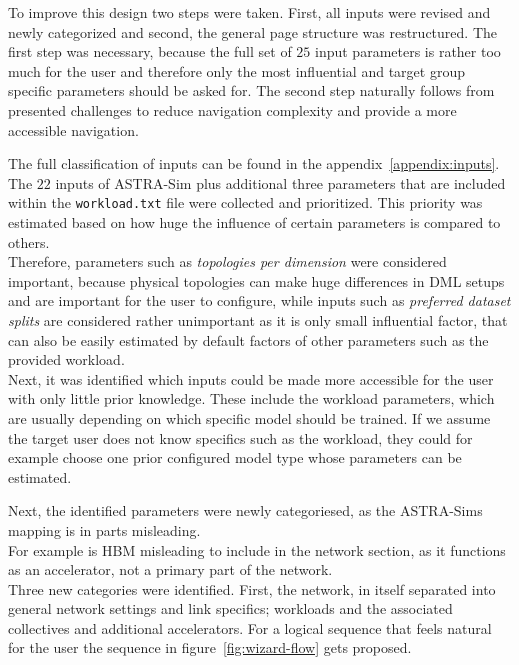 To improve this design two steps were taken. First, all inputs were revised and newly categorized and second, the general page structure was restructured. The first step was necessary, because the full set of $25$ input parameters is rather too much for the user and therefore only the most influential and target group specific parameters should be asked for. The second step naturally follows from presented challenges to reduce navigation complexity and provide a more accessible navigation. 

The full classification of inputs can be found in the appendix~\ref{appendix:inputs}.
The $22$ inputs of \ac{ASTRA-Sim} plus additional three parameters that are included within the \texttt{workload.txt} file were collected and prioritized. This priority was estimated based on how huge the influence of certain parameters is compared to others. \\
Therefore, parameters such as \textit{topologies per dimension} were considered important, because physical topologies can make huge differences in \ac{DML} setups and are important for the user to configure, while inputs such as \textit{preferred dataset splits} are considered rather unimportant as it is only small influential factor, that can also be easily estimated by default factors of other parameters such as the provided workload. \\
Next, it was identified which inputs could be made more accessible for the user with only little prior knowledge. These include the workload parameters, which are usually depending on which specific model should be trained.
If we assume the target user does not know specifics such as the workload, they could for example choose one prior configured model type whose parameters can be estimated.

Next, the identified parameters were newly categoriesed, as the \acp{ASTRA-Sim} mapping is in parts misleading. \\
For example is \ac{HBM} misleading to include in the network section, as it functions as an accelerator, not a primary part of the network. \\
Three new categories were identified. First, the network, in itself separated into general network settings and link specifics; workloads and the associated collectives and additional accelerators. 
For a logical sequence that feels natural for the user the sequence in figure~\ref{fig:wizard-flow} gets proposed.

